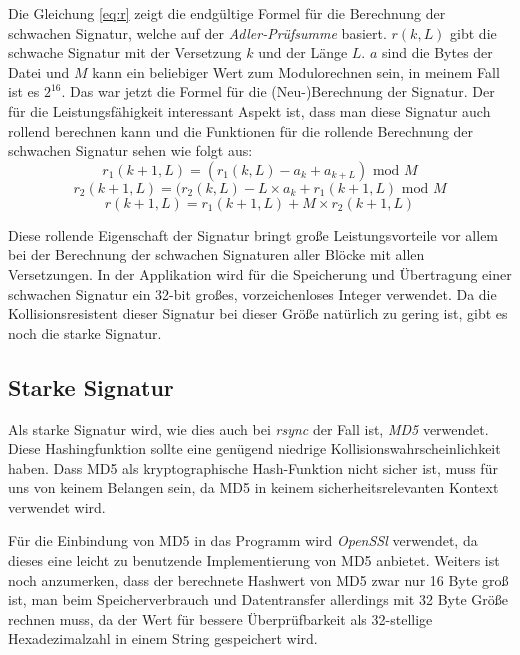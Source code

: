 Die Gleichung \ref{eq:r} zeigt die endgültige Formel für die Berechnung der schwachen Signatur, welche auf der \textit{Adler-Prüfsumme} 
basiert\cite{Tridgell99}. $r(k,L)$ gibt die schwache Signatur mit der Versetzung $k$ und der Länge $L$. $a$ sind die Bytes der Datei und $M$ kann ein 
beliebiger Wert zum Modulorechnen sein, in meinem Fall ist es $2^{16}$. Das war jetzt die Formel für die (Neu-)Berechnung der Signatur. Der für die Leistungsfähigkeit interessant Aspekt ist, dass man diese Signatur auch rollend berechnen kann und die Funktionen für die rollende Berechnung der schwachen 
Signatur sehen wie folgt aus\cite{Tridgell99}:
\begin{equation}
    r_1(k+1,L) = (r_1(k,L)-a_k+a_{k+L}) \textrm{ mod } M 
\end{equation}
\begin{equation}
    r_2(k+1,L) = (r_2(k,L)-L \times a_k+r_1(k+1,L) \textrm{ mod } M 
\end{equation}
\begin{equation}
    r(k+1,L) = r_1(k+1,L) + M \times r_2(k+1,L)
\end{equation}

Diese rollende Eigenschaft der Signatur bringt große Leistungsvorteile vor allem bei der Berechnung der schwachen Signaturen aller Blöcke mit allen 
Versetzungen. In der Applikation wird für die Speicherung und Übertragung einer schwachen Signatur ein 32-bit großes, vorzeichenloses Integer verwendet.
Da die Kollisionsresistent dieser Signatur bei dieser Größe natürlich zu gering ist, gibt es noch die starke Signatur.

\subsection{Starke Signatur}
\label{sec:starke_signatur}

Als starke Signatur wird, wie dies auch bei \textit{rsync} der Fall ist, \textit{MD5} verwendet\cite{rsync}. Diese Hashingfunktion sollte eine genügend 
niedrige Kollisionswahrscheinlichkeit haben. Dass MD5 als kryptographische Hash-Funktion nicht sicher ist, muss für uns von keinem Belangen sein,
da MD5 in keinem sicherheitsrelevanten Kontext verwendet wird.

Für die Einbindung von MD5 in das Programm wird \textit{OpenSSl}\cite{openssl} verwendet, da dieses eine leicht zu benutzende Implementierung 
von MD5 anbietet. Weiters ist noch anzumerken, dass der berechnete Hashwert von MD5 zwar nur 16 Byte groß ist, man beim Speicherverbrauch und
Datentransfer allerdings mit 32 Byte Größe rechnen muss, da der Wert für bessere Überprüfbarkeit als 32-stellige Hexadezimalzahl in einem String
gespeichert wird.

